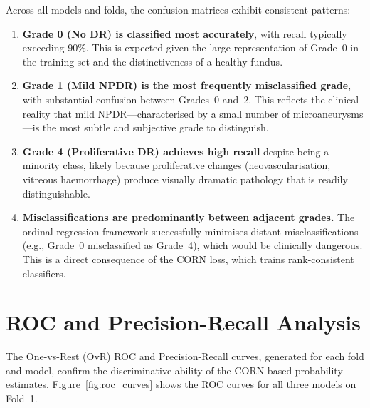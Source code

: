 Across all models and folds, the confusion matrices exhibit consistent patterns:

\begin{enumerate}
    \item \textbf{Grade 0 (No DR) is classified most accurately}, with recall typically exceeding 90\%. This is expected given the large representation of Grade~0 in the training set and the distinctiveness of a healthy fundus.
    
    \item \textbf{Grade 1 (Mild NPDR) is the most frequently misclassified grade}, with substantial confusion between Grades~0 and~2. This reflects the clinical reality that mild NPDR---characterised by a small number of microaneurysms---is the most subtle and subjective grade to distinguish.
    
    \item \textbf{Grade 4 (Proliferative DR) achieves high recall} despite being a minority class, likely because proliferative changes (neovascularisation, vitreous haemorrhage) produce visually dramatic pathology that is readily distinguishable.
    
    \item \textbf{Misclassifications are predominantly between adjacent grades.} The ordinal regression framework successfully minimises distant misclassifications (e.g., Grade~0 misclassified as Grade~4), which would be clinically dangerous. This is a direct consequence of the CORN loss, which trains rank-consistent classifiers.
\end{enumerate}

\section{ROC and Precision-Recall Analysis}
\label{sec:roc_pr}

The One-vs-Rest (OvR) ROC and Precision-Recall curves, generated for each fold and model, confirm the discriminative ability of the CORN-based probability estimates. Figure~\ref{fig:roc_curves} shows the ROC curves for all three models on Fold~1.

